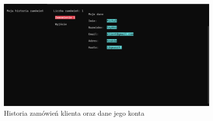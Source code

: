 \begin{figure}[H]
	\centering
		\includegraphics[width=15cm]{screeny/historia_klienta.png}
	\caption{\footnotesize Historia zamówień klienta oraz dane jego konta}
	\label{fig:plotend}
\end{figure}